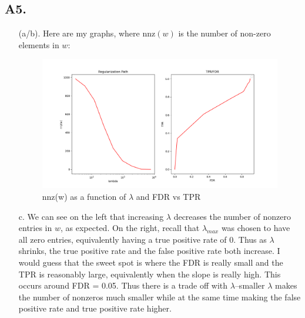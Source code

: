 \documentclass[12pt]{article}
\theoremstyle{definitionstyle}
\begin{document}
    \subsection*{A5.}
    \begin{enumerate}[label=\alph*.]
        \item[(a/b).] Here are my graphs, where $\mathrm{nnz}(w)$ is the number of non-zero elements in $w$:
        \begin{figure}[H]
            \centering
            \includegraphics[width=\textwidth]{regpath_fdr_tpr.png}
            \caption{nnz(w) as a function of $\lambda$ and FDR vs TPR}
        \end{figure}

        \item[c.] We can see on the left that increasing $\lambda$ decreases the number of nonzero entries in $w$, as expected. On the right, recall that $\lambda_{max}$ was chosen to have all zero entries, equivalently having a true positive rate of 0. Thus as $\lambda$ shrinks, the true positive rate and the false positive rate both increase. I would guess that the sweet spot is where the FDR is really small and the TPR is reasonably large, equivalently when the slope is really high. This occurs around FDR = 0.05. Thus there is a trade off with $\lambda$--smaller $\lambda$ makes the number of nonzeros much smaller while at the same time making the false positive rate and true positive rate higher.
    \end{enumerate}
\end{document}
